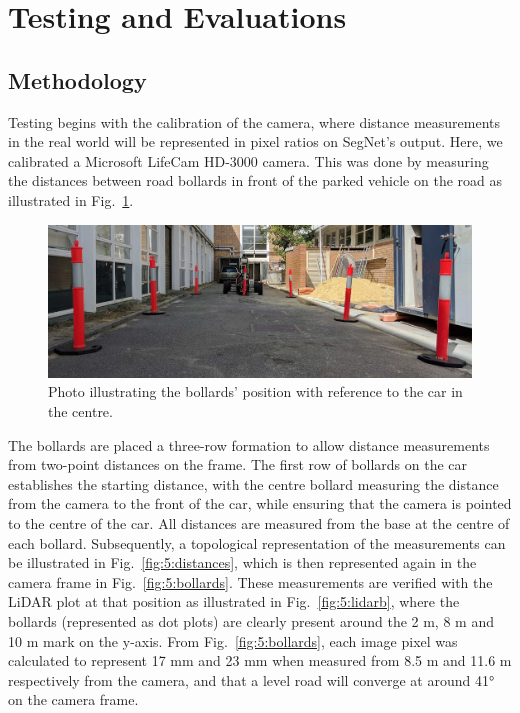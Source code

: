 \section{Testing and Evaluations}
\subsection{Methodology} \label{secmethod}
Testing begins with the calibration of the camera, where distance measurements in the real world will be represented in pixel ratios on SegNet's output. Here, we calibrated a Microsoft LifeCam HD-3000 camera. This was done by measuring the distances between road bollards in front of the parked vehicle on the road as illustrated in Fig.~\ref{fig:5:front}.

\begin{figure}[H]
	\centering
	\includegraphics[width=0.8\linewidth]{front}
	\caption[Bollards' position with reference to the car]{Photo illustrating the bollards' position with reference to the car in the centre.}
	\label{fig:5:front}
\end{figure}

The bollards are placed a three-row formation to allow distance measurements from two-point distances on the frame. The first row of bollards on the car establishes the starting distance, with the centre bollard measuring the distance from the camera to the front of the car, while ensuring that the camera is pointed to the centre of the car. All distances are measured from the base at the centre of each bollard. Subsequently, a topological representation of the measurements can be illustrated in Fig.~\ref{fig:5:distances}, which is then represented again in the camera frame in Fig.~\ref{fig:5:bollards}. These measurements are verified with the LiDAR plot at that position as illustrated in Fig.~\ref{fig:5:lidarb}, where the bollards (represented as dot plots) are clearly present around the 2 m, 8 m and 10 m mark on the y-axis. From Fig.~\ref{fig:5:bollards}, each image pixel was calculated to represent 17 mm and 23 mm when measured from 8.5 m and 11.6 m respectively from the camera, and that a level road will converge at around \ang{41} on the camera frame.

